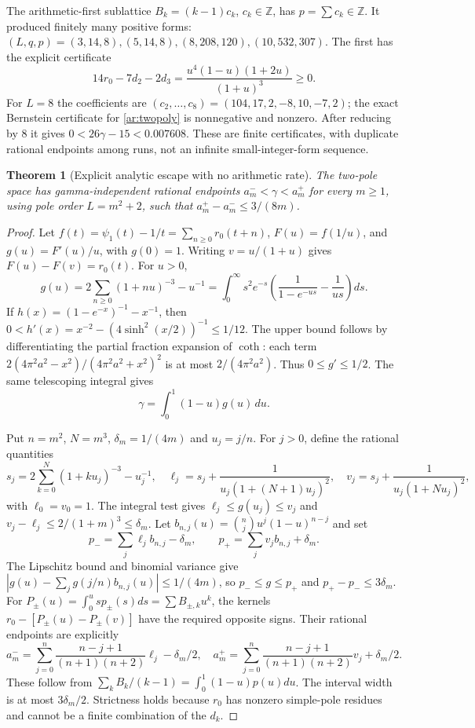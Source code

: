 \documentclass[11pt,a4paper]{article}
\newcommand{\Z}{\mathbb Z}
\newtheorem{theorem}{Theorem}[section]
\theoremstyle{definition}
\theoremstyle{remark}
\numberwithin{equation}{section}
\begin{document}
The arithmetic-first sublattice $B_k=(k-1)c_k$, $c_k\in\Z$, has
$p=\sum c_k\in\Z$.  It produced finitely many positive forms:
$(L,q,p)=(3,14,8),(5,14,8),(8,208,120),(10,532,307)$.
The first has the explicit certificate
\[
 14r_0-7d_2-2d_3=
 \frac{u^4(1-u)(1+2u)}{(1+u)^3}\ge0.
\]
For $L=8$ the coefficients are
$(c_2,\ldots,c_8)=(104,17,2,-8,10,-7,2)$; the exact Bernstein
certificate for \eqref{ar:twopoly} is nonnegative and nonzero.
After reducing by $8$ it gives $0<26\gamma-15<0.007608$.
These are finite certificates, with duplicate rational endpoints among
runs, not an infinite small-integer-form sequence.

\begin{theorem}[Explicit analytic escape with no arithmetic rate]
\label{ar:twosequence}
The two-pole space has gamma-independent rational endpoints
$a_m^-<\gamma<a_m^+$ for every $m\ge1$, using pole order $L=m^2+2$, such
that $a_m^+-a_m^-\le3/(8m)$.
\end{theorem}
\begin{proof}
Let $f(t)=\psi_1(t)-1/t=\sum_{n\ge0}r_0(t+n)$,
$F(u)=f(1/u)$, and $g(u)=F'(u)/u$, with $g(0)=1$.
Writing $v=u/(1+u)$ gives $F(u)-F(v)=r_0(t)$.
For $u>0$,
\[
 g(u)=2\sum_{n\ge0}(1+nu)^{-3}-u^{-1}
 =\int_0^\infty s^2e^{-s}
   \left(\frac1{1-e^{-us}}-\frac1{us}\right)ds.
\]
If $h(x)=(1-e^{-x})^{-1}-x^{-1}$, then
$0<h'(x)=x^{-2}-(4\sinh^2(x/2))^{-1}\le1/12$.
The upper bound follows by differentiating the partial fraction expansion
of $\coth$: each term
$2(4\pi^2a^2-x^2)/(4\pi^2a^2+x^2)^2$ is at most
$2/(4\pi^2a^2)$.  Thus $0\le g'\le1/2$.  The same telescoping integral gives
\[\gamma=\int_0^1(1-u)g(u)\,du.\]

Put $n=m^2$, $N=m^3$, $\delta_m=1/(4m)$ and $u_j=j/n$.
For $j>0$, define the rational quantities
\[
 s_j=2\sum_{k=0}^N(1+ku_j)^{-3}-u_j^{-1},\quad
 \ell_j=s_j+\frac1{u_j(1+(N+1)u_j)^2},\quad
 v_j=s_j+\frac1{u_j(1+Nu_j)^2},
\]
with $\ell_0=v_0=1$.  The integral test gives
$\ell_j\le g(u_j)\le v_j$ and
$v_j-\ell_j\le2/(1+m)^3\le\delta_m$.
Let $b_{n,j}(u)=\binom nj u^j(1-u)^{n-j}$ and set
\[
 p_- =\sum_j\ell_jb_{n,j}-\delta_m,\qquad
 p_+ =\sum_jv_jb_{n,j}+\delta_m.
\]
The Lipschitz bound and binomial variance give
$|g(u)-\sum_jg(j/n)b_{n,j}(u)|\le1/(4m)$, so
$p_-\le g\le p_+$ and $p_+-p_-\le3\delta_m$.
For $P_\pm(u)=\int_0^u sp_\pm(s)ds=\sum B_{\pm,k}u^k$, the
kernels $r_0-[P_\pm(u)-P_\pm(v)]$ have the required opposite signs.
Their rational endpoints are explicitly
\[
 a_m^- =\sum_{j=0}^n\frac{n-j+1}{(n+1)(n+2)}\ell_j-\delta_m/2,
 \quad
 a_m^+ =\sum_{j=0}^n\frac{n-j+1}{(n+1)(n+2)}v_j+\delta_m/2.
\]
These follow from
$\sum_kB_k/(k-1)=\int_0^1(1-u)p(u)du$.
The interval width is at most $3\delta_m/2$.
Strictness holds because $r_0$ has nonzero simple-pole residues and cannot
be a finite combination of the $d_k$.
\end{proof}
\end{document}
